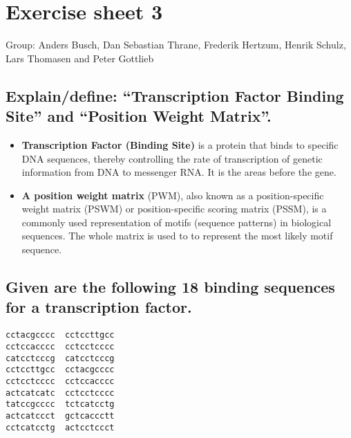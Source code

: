 \documentclass[a4paper,10pt,titlepage]{article}
\begin{document}
\section*{Exercise sheet 3}

Group: Anders Busch, Dan Sebastian Thrane, Frederik Hertzum, Henrik Schulz, Lars Thomasen and Peter Gottlieb

\subsection*{Explain/define: “Transcription Factor Binding Site” and “Position Weight Matrix”.}

\begin{itemize}
\item
\textbf{Transcription Factor (Binding Site)} is a protein that binds to specific DNA sequences, thereby controlling the rate of transcription of genetic information from DNA to messenger RNA. It is the areas before the gene.
\item
\textbf{A position weight matrix} (PWM), also known as a position-specific weight matrix (PSWM) or position-specific scoring matrix (PSSM), is a commonly used representation of motifs (sequence patterns) in biological sequences. The whole matrix is used to to represent the most likely motif sequence.
\end{itemize}

\subsection*{Given are the following 18 binding sequences for a transcription factor.}

\begin{verbatim}
cctacgcccc	cctccttgcc
cctccacccc	cctcctcccc
catcctcccg	catcctcccg
cctccttgcc	cctacgcccc
cctcctcccc	cctccacccc
actcatcatc	cctcctcccc
tatccgcccc	tctcatcctg
actcatccct	gctcaccctt
cctcatcctg	actcctccct
\end{verbatim}
\end{document}
